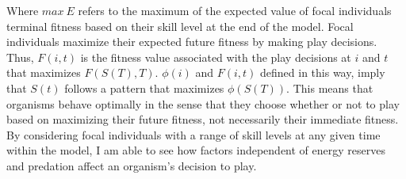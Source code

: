\documentclass[12pt,letterpaper]{article}
\begin{document}

    Where $max~E$ refers to the maximum of the expected value of focal individuals terminal fitness based on their skill level at the end of the model.
    Focal individuals maximize their expected future fitness by making play decisions. %
    Thus, $F(i,t)$ is the fitness value associated with the play decisions at $i$ and $t$ that maximizes $F(S(T),T)$. %
    $\phi(i)$ and $F(i,t)$ defined in this way, imply that $S(t)$ follows a pattern that maximizes $\phi(S(T))$. %
    This means that organisms behave optimally in the sense that they choose whether or not to play based on maximizing their future fitness, not necessarily their immediate fitness. %
    By considering focal individuals with a range of skill levels at any given time within the model, I am able to see how factors independent of energy reserves and predation affect an organism's decision to play.   
    
    
  
\end{document}
